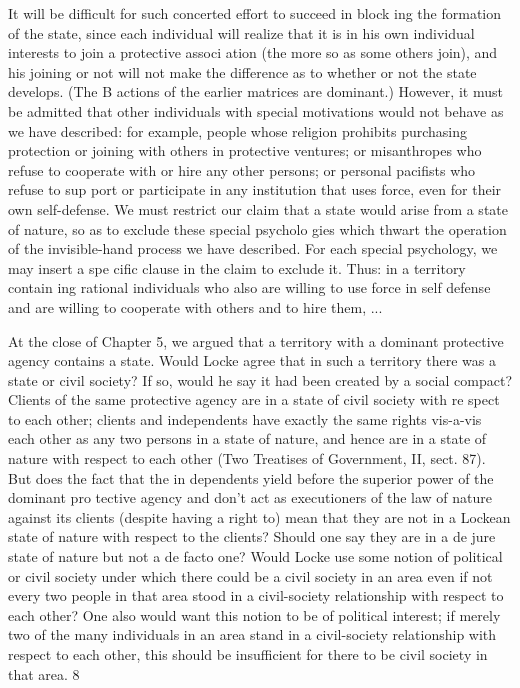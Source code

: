 \documentclass[11pt,openany]{book}
\begin{document}
It will be difficult for such concerted effort to succeed in block ing the formation of the state, since each individual will realize that it is in his own individual interests to join a protective associ ation (the more so as some others join), and his joining or not will not make the difference as to whether or not the state develops. (The B actions of the earlier matrices are dominant.) However, it must be admitted that other individuals with special motivations would not behave as we have described: for example, people whose religion prohibits purchasing protection or joining with others in protective ventures; or misanthropes who refuse to cooperate with or hire any other persons; or personal pacifists who refuse to sup port or participate in any institution that uses force, even for their own self-defense. We must restrict our claim that a state would arise from a state of nature, so as to exclude these special psycholo gies which thwart the operation of the invisible-hand process we have described. For each special psychology, we may insert a spe cific clause in the claim to exclude it. Thus: in a territory contain ing rational individuals who also are willing to use force in self defense and are willing to cooperate with others and to hire them, ... 

At the close of Chapter 5, we argued that a territory with a dominant protective agency contains a state. Would Locke agree that in such a territory there was a state or civil society? If so, would he say it had been created by a social compact? Clients of the same protective agency are in a state of civil society with re spect to each other; clients and independents have exactly the same rights vis-a-vis each other as any two persons in a state of nature, and hence are in a state of nature with respect to each other (Two Treatises of Government, II, sect. 87). But does the fact that the in dependents yield before the superior power of the dominant pro tective agency and don't act as executioners of the law of nature against its clients (despite having a right to) mean that they are not in a Lockean state of nature with respect to the clients? Should one say they are in a de jure state of nature but not a de facto one? Would Locke use some notion of political or civil society under which there could be a civil society in an area even if not every two people in that area stood in a civil-society relationship with respect to each other? One also would want this notion to be of political interest; if merely two of the many individuals in an area stand in a civil-society relationship with respect to each other, this should be insufficient for there to be civil society in that area. 8 
\end{document}
